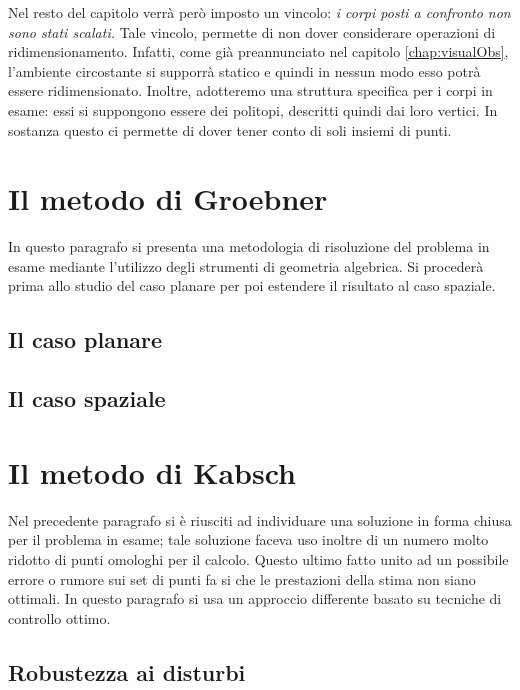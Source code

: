 Nel resto del capitolo verrà però imposto un vincolo: \textit{i corpi posti a confronto non sono stati scalati.} Tale vincolo, permette di non dover considerare operazioni di ridimensionamento. Infatti, come già preannunciato nel capitolo \ref{chap:visualObs}, l'ambiente circostante si supporrà statico e quindi in nessun modo esso potrà essere ridimensionato.
Inoltre, adotteremo una struttura specifica per i corpi in esame: essi si suppongono essere dei politopi, descritti quindi dai loro vertici. In sostanza questo ci permette di dover tener conto di soli insiemi di punti. 




\section{Il metodo di Groebner}
\label{sec:groeb}
In questo paragrafo si presenta una metodologia di risoluzione del problema in esame mediante l'utilizzo degli strumenti di geometria algebrica. Si procederà prima allo studio del caso planare per poi estendere il risultato al caso spaziale.

\subsection{Il caso planare}
\label{sec:groeb:plan}

\subsection{Il caso spaziale}
\label{sec:groeb:spaz}


\section{Il metodo di Kabsch}
\label{sec:kabsch}

Nel precedente paragrafo si è riusciti ad individuare una soluzione in forma chiusa per il problema in esame; tale soluzione faceva uso inoltre di un numero molto ridotto di punti omologhi per il calcolo. Questo ultimo fatto unito ad un possibile errore o rumore sui set di punti fa si che le prestazioni della stima non siano ottimali. In questo paragrafo si usa un approccio differente basato su tecniche di controllo ottimo.

\subsection{Robustezza ai disturbi}
\label{sec:kabsch:rumore}
